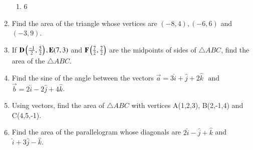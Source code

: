 \begin{enumerate}[label=\thesubsection.\arabic*,ref=\thesubsection.\theenumi]
\begin{enumerate}
\item 6
\end{enumerate}
\item Find the area of the triangle whose vertices are $(-8,4),(-6,6)$ and $(-3,9)$.
\item If $\mathbf{D}\left(\frac{-1}{2},\frac{5}{2}\right),\mathbf{E}(7,3)$ and $\mathbf{F}\left(\frac{7}{2},\frac{7}{2}\right)$ are the midpoints of sides of $\triangle ABC$, find the area of the $\triangle ABC$.
\item Find the sine of the angle between the vectors $\vec{a}=3\hat{i}+\hat{j}+2\hat{k}$ $\text{ and }$ $\vec{b}=2\hat{i}-2\hat{j}+4\hat{k}$.
\item Using vectors, find the area of $\triangle{ABC}$ with vertices A(1,2,3), B(2,-1,4) and C(4,5,-1).
\item Find the area of the parallelogram whose diagonals are $2\hat{i}-\hat{j}+\hat{k}$ and $\hat{i}+3\hat{j}-\hat{k}$.


\end{enumerate}
